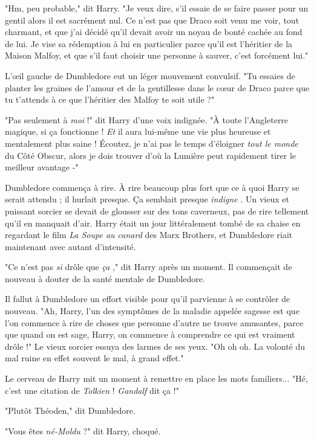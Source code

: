 "Hm, peu probable," dit Harry. "Je veux dire, s'il essaie de se faire passer pour un gentil alors il est sacrément nul. Ce n'est pas que Draco soit venu me voir, tout charmant, et que j'ai décidé qu'il devait avoir un noyau de bonté cachée au fond de lui. Je vise sa rédemption à lui en particulier parce qu'il est l'héritier de la Maison Malfoy, et que s'il faut choisir une personne à sauver, c'est forcément lui."

L'œil gauche de Dumbledore eut un léger mouvement convulsif. "Tu essaies de planter les graines de l'amour et de la gentillesse dans le cœur de Draco parce que tu t'attends à ce que l'héritier des Malfoy te soit utile ?"

"Pas seulement à \emph{moi}  !" dit Harry d'une voix indignée. "À toute l'Angleterre magique, si ça fonctionne ! \emph{Et}  il aura lui-même une vie plus heureuse et mentalement plus saine ! Écoutez, je n'ai pas le temps d'éloigner \emph{tout le monde}  du Côté Obscur, alors je dois trouver d'où la Lumière peut rapidement tirer le meilleur avantage -"

Dumbledore commença à rire. À rire beaucoup plus fort que ce à quoi Harry se serait attendu ; il hurlait presque. Ça semblait presque \emph{indigne} . Un vieux et puissant sorcier se devait de glousser sur des tons caverneux, pas de rire tellement qu'il en manquait d'air. Harry était un jour littéralement tombé de sa chaise en regardant le film \emph{La Soupe au canard}  des Marx Brothers, et Dumbledore riait maintenant avec autant d'intensité.

"Ce n'est pas \emph{si } drôle que \emph{ça} ," dit Harry après un moment. Il commençait de nouveau à douter de la santé mentale de Dumbledore.

Il fallut à Dumbledore un effort visible pour qu'il parvienne à se contrôler de nouveau. "Ah, Harry, l'un des symptômes de la maladie appelée sagesse est que l'on commence à rire de choses que personne d'autre ne trouve amusantes, parce que quand on est sage, Harry, on commence à comprendre ce qui est vraiment drôle !" Le vieux sorcier essuya des larmes de ses yeux. "Oh oh oh. La volonté du mal ruine en effet souvent le mal, à grand effet."

Le cerveau de Harry mit un moment à remettre en place les mots familiers... "Hé, c'est une citation de \emph{Tolkien}  ! \emph{Gandalf } dit ça !"

"Plutôt Théoden," dit Dumbledore.

"Vous êtes \emph{né-Moldu}  ?" dit Harry, choqué.

